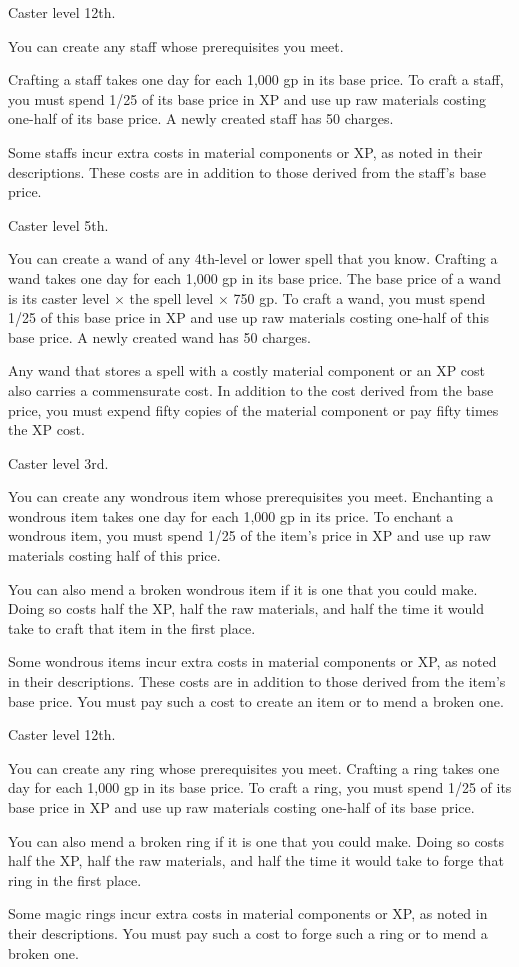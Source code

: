 {Caster level 12th.}
{You can create any staff whose prerequisites you meet.

Crafting a staff takes one day for each 1,000 gp in its base price. To craft a staff, you must spend 1/25 of its base price in XP and use up raw materials costing one-half of its base price. A newly created staff has 50 charges.

Some staffs incur extra costs in material components or XP, as noted in their descriptions. These costs are in addition to those derived from the staff’s base price.}

{Caster level 5th.}
{You can create a wand of any 4th-level or lower spell that you know. Crafting a wand takes one day for each 1,000 gp in its base price. The base price of a wand is its caster level $\times$ the spell level $\times$ 750 gp. To craft a wand, you must spend 1/25 of this base price in XP and use up raw materials costing one-half of this base price. A newly created wand has 50 charges.

Any wand that stores a spell with a costly material component or an XP cost also carries a commensurate cost. In addition to the cost derived from the base price, you must expend fifty copies of the material component or pay fifty times the XP cost.}

{Caster level 3rd.}
{You can create any wondrous item whose prerequisites you meet. Enchanting a wondrous item takes one day for each 1,000 gp in its price. To enchant a wondrous item, you must spend 1/25 of the item’s price in XP and use up raw materials costing half of this price.

You can also mend a broken wondrous item if it is one that you could make. Doing so costs half the XP, half the raw materials, and half the time it would take to craft that item in the first place.

Some wondrous items incur extra costs in material components or XP, as noted in their descriptions. These costs are in addition to those derived from the item’s base price. You must pay such a cost to create an item or to mend a broken one.}

{Caster level 12th.}
{You can create any ring whose prerequisites you meet. Crafting a ring takes one day for each 1,000 gp in its base price. To craft a ring, you must spend 1/25 of its base price in XP and use up raw materials costing one-half of its base price.

You can also mend a broken ring if it is one that you could make. Doing so costs half the XP, half the raw materials, and half the time it would take to forge that ring in the first place.

Some magic rings incur extra costs in material components or XP, as noted in their descriptions. You must pay such a cost to forge such a ring or to mend a broken one.}

